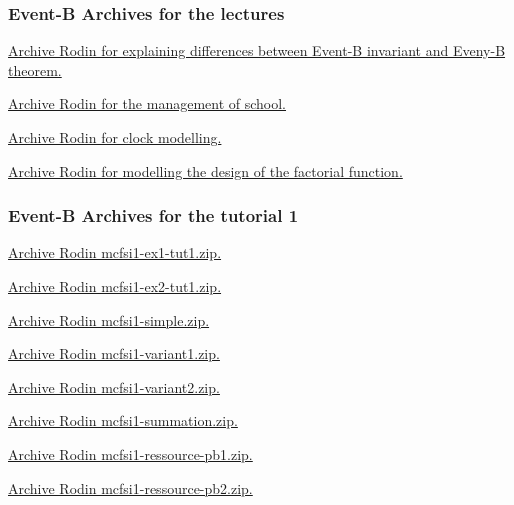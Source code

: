 \documentclass[ 12pt]{article}
\begin{document}
\subsubsection{Event-B Archives for the  lectures}

 \href{http://mery54.github.io/teaching/mosos/lecturesnotes/
   ex-safety.zip}{Archive Rodin  for  explaining differences between
   Event-B invariant and Eveny-B theorem. }


 
 \href{http://mery54.github.io/teaching/mosos/lecturesnotes/
   ex-school.zip}{Archive Rodin  for   the management of school. }

 
 
 \href{http://mery54.github.io/teaching/mosos/lecturesnotes/
   clock-tut0.zip}{Archive Rodin  for  clock modelling. }

  \href{http://mery54.github.io/teaching/mosos/lecturesnotes/factorial-plugin-tutO.zip}{Archive Rodin  for   modelling  the 
   design of the factorial function.}
  


 \subsubsection{Event-B Archives for   the tutorial 1}
\label{sec:event-b-archives}



\href{http://mery54.github.io/teaching/mosos/models/mcfsi1-ex1-tut1.zip}{Archive
  Rodin   mcfsi1-ex1-tut1.zip.}

\href{http://mery54.github.io/teaching/mosos/models/mcfsi1-ex1-tut1.zip}{Archive
  Rodin   mcfsi1-ex2-tut1.zip.}


\href{http://mery54.github.io/teaching/mosos/models/mcfsi1-simple.zip}{Archive 
  Rodin   mcfsi1-simple.zip.}

\href{http://mery54.github.io/teaching/mosos/models/mcfsi1-variant1.zip}{Archive 
  Rodin   mcfsi1-variant1.zip.}

\href{http://mery54.github.io/teaching/mosos/models/mcfsi1-variant2.zip}{Archive 
  Rodin   mcfsi1-variant2.zip.}


\href{http://mery54.github.io/teaching/mosos/models/mcfsi1-summation.zip}{Archive 
  Rodin   mcfsi1-summation.zip.}


\href{http://mery54.github.io/teaching/mosos/models/mcfsi1-ressource-pb1.zip}{Archive 
  Rodin   mcfsi1-ressource-pb1.zip.}


\href{http://mery54.github.io/teaching/mosos/models/mcfsi1-ressource-pb1.zip}{Archive 
  Rodin   mcfsi1-ressource-pb2.zip.}
\end{document}
